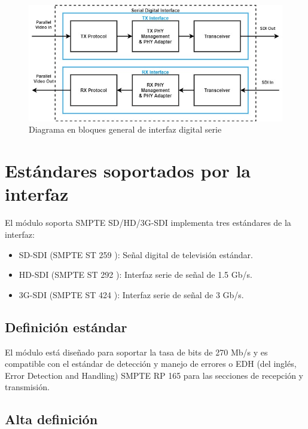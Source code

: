 \vspace{1cm}
\begin{figure}[htbp]
    \centering
    \includegraphics[width=\linewidth]{./Figures/sdi.jpg}
    \caption{Diagrama en bloques general de interfaz digital serie}\label{fig:sdi1}
\end{figure}
\vspace{1cm}

\section{Estándares soportados por la interfaz}

El módulo soporta SMPTE SD/HD/3G-SDI implementa tres estándares de la interfaz:

\begin{itemize}
    \item SD-SDI (SMPTE ST 259 \citep{st259}): Señal digital de televisión estándar.
    \item HD-SDI (SMPTE ST 292 \citep{st292}): Interfaz serie de señal de 1.5 Gb/s.
    \item 3G-SDI (SMPTE ST 424 \citep{st424}): Interfaz serie de señal de 3 Gb/s.
\end{itemize}

\subsection{Definición estándar}

El módulo está diseñado para soportar la tasa de bits de 270 Mb/s y es compatible
con el estándar de detección y manejo de errores o EDH (del inglés, Error
Detection and Handling) SMPTE RP 165 \citep{st165} para las secciones de recepción y transmisión.

\subsection{Alta definición}

